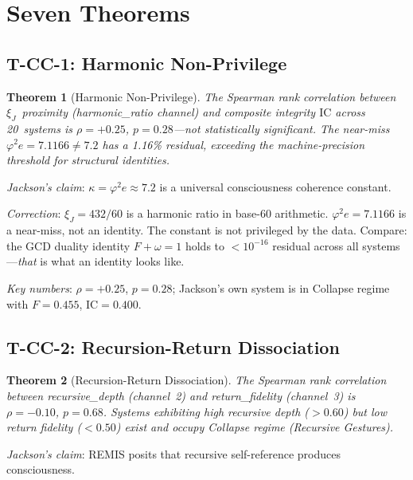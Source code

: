 \documentclass[
  aps,
  prd,
  twocolumn,
  superscriptaddress,
  nofootinbib,
  floatfix
]{revtex4-2}
\newtheorem{theorem}{Theorem}
\newcommand{\IC}{\mathrm{IC}}
\newcommand{\xiJ}{\xi_J}
\begin{document}
\section{Seven Theorems}
\label{sec:theorems}

\subsection{T-CC-1: Harmonic Non-Privilege}

\begin{theorem}[Harmonic Non-Privilege]
The Spearman rank correlation between $\xiJ$~proximity (harmonic\_ratio
channel) and composite integrity $\IC$ across 20~systems is
$\rho = +0.25$, $p = 0.28$---not statistically significant.
The near-miss $\varphi^2 e = 7.1166 \neq 7.2$ has a 1.16\% residual,
exceeding the machine-precision threshold for structural identities.
\end{theorem}

\emph{Jackson's claim}: $\kappa = \varphi^2 e \approx 7.2$ is a universal
consciousness coherence constant.

\emph{Correction}: $\xiJ = 432/60$ is a harmonic ratio in base-60
arithmetic.  $\varphi^2 e = 7.1166$ is a near-miss, not an identity.
The constant is not privileged by the data.  Compare: the GCD duality
identity $F + \omega = 1$ holds to $< 10^{-16}$ residual across all
systems---\emph{that} is what an identity looks like.

\emph{Key numbers}: $\rho = +0.25$, $p = 0.28$; Jackson's own system
is in Collapse regime with $F = 0.455$, $\IC = 0.400$.

\subsection{T-CC-2: Recursion-Return Dissociation}

\begin{theorem}[Recursion-Return Dissociation]
The Spearman rank correlation between recursive\_depth (channel~2) and
return\_fidelity (channel~3) is $\rho = -0.10$, $p = 0.68$.  Systems
exhibiting high recursive depth ($> 0.60$) but low return fidelity
($< 0.50$) exist and occupy Collapse regime (Recursive Gestures).
\end{theorem}

\emph{Jackson's claim}: REMIS posits that recursive self-reference
produces consciousness.
\end{document}
